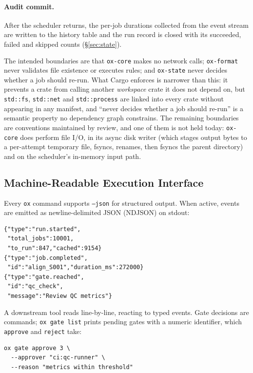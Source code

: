 \documentclass[12pt,a4paper]{article}
\newcommand{\code}[1]{{\texttt{\small\color{inlinecode}#1}}}
\begin{document}
\paragraph{Audit commit.}
After the scheduler returns, the per-job durations collected from the
event stream are written to the history table and the run record is
closed with its succeeded, failed and skipped counts
(\S\ref{sec:state}).

\noindent The intended boundaries are that \code{ox-\allowbreak{}core}
makes no network calls; \code{ox-\allowbreak{}format} never
validates file existence or executes rules; and \code{ox-\allowbreak{}state} never
decides whether a job should re-run.  What Cargo enforces is narrower
than this: it prevents a crate from calling another \emph{workspace}
crate it does not depend on, but \code{std::fs}, \code{std::net} and
\code{std::process} are linked into every crate without appearing in any
manifest, and ``never decides whether a job should re-run'' is a
semantic property no dependency graph constrains. The remaining
boundaries are conventions maintained by review, and one of them is not
held today: \code{ox-\allowbreak{}core} does perform file I/O, in its
async disk writer (which stages output bytes to a per-attempt temporary
file, fsyncs, renames, then fsyncs the parent directory) and on the
scheduler's in-memory input path.

\subsection{Machine-Readable Execution Interface}
\label{sec:agent-api}

Every \code{ox} command supports \code{--json} for structured output.
When active, events are emitted as newline-delimited JSON (NDJSON) on
stdout:

\begin{lstlisting}[style=shell]
{"type":"run.started",
 "total_jobs":10001,
 "to_run":847,"cached":9154}
{"type":"job.completed",
 "id":"align_S001","duration_ms":272000}
{"type":"gate.reached",
 "id":"qc_check",
 "message":"Review QC metrics"}
\end{lstlisting}

A downstream tool reads line-by-line, reacting to typed events. Gate
decisions are commands; \code{ox gate list} prints pending gates with a
numeric identifier, which \code{approve} and \code{reject} take:

\begin{lstlisting}[style=shell]
ox gate approve 3 \
  --approver "ci:qc-runner" \
  --reason "metrics within threshold"
\end{lstlisting}
\end{document}
